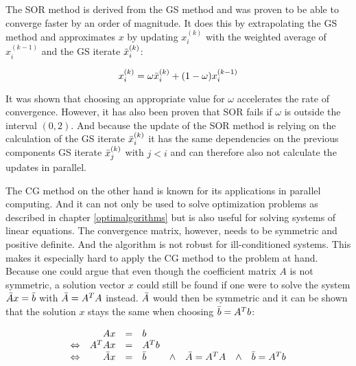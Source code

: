 The \acl{SOR} method is derived from the \acl{GS} method and was proven to be able to converge faster by an order of magnitude.\textsuperscript{\cite{BlackStationaryMethod}} It does this by extrapolating the \acl{GS} method and approximates $x$ by updating $x_i^{(k)}$ with the weighted average of $x_i^{(k-1)}$ and the \acl{GS} iterate $\Bar{x}_i^{(k)}$:

\begin{equation}\label{eq:SOR_update}
   x_i^{(k)} = \omega \Bar{x}_i^{(k)} + (1-\omega)x_i^{(k-1)}
\end{equation}

It was shown that choosing an appropriate value for $\omega$ accelerates the rate of convergence. However, it has also been proven that \acl{SOR} fails if $\omega$ is outside the interval $(0,2)$.\textsuperscript{\cite{BlackSuccessiveMethod}} And because the update of the \acl{SOR} method is relying on the calculation of the \acl{GS} iterate $\Bar{x}_i^{(k)}$ it has the same dependencies on the previous components \acl{GS} iterate $\Bar{x}_j^{(k)}$ with $j<i$ and can therefore also not calculate the updates in parallel.

The \acl{CG} method on the other hand is known for its applications in parallel computing. And it can not only be used to solve optimization problems as described in chapter \ref{optimalgorithms} but is also useful for solving systems of linear equations. The convergence matrix, however, needs to be symmetric and positive definite.\textsuperscript{\cite[p.~3]{Rambo2016TheEquations}} And the algorithm is not robust for ill-conditioned systems.\textsuperscript{\cite[p.~19]{Rambo2016TheEquations}} This makes it especially hard to apply the \acs{CG} method to the problem at hand. Because one could argue that even though the coefficient matrix $A$ is not symmetric, a solution vector $x$ could still be found if one were to solve the system $\Bar{A}x=\Bar{b}$ with $\Bar{A} = A^T A$ instead. $\Bar{A}$ would then be symmetric and it can be shown that the solution $x$ stays the same when choosing $\Bar{b}=A^T b$:

\begin{equation}\label{eq:symmetrify_Axb}
    \begin{array}{lrcllclc}
       & A x &=& b &&&& \\
       \Leftrightarrow & A^T A x &=& A^T b &&&& \\
       \Leftrightarrow & \Bar{A} x &=& \Bar{b} &\wedge& \Bar{A} = A^T A &\wedge& \Bar{b}=A^T b 
    \end{array}
\end{equation}

